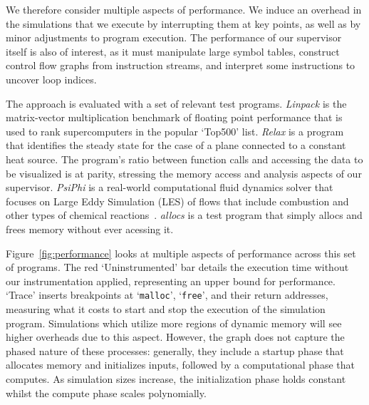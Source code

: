 %

We therefore consider multiple aspects of performance.  We induce an
overhead in the simulations that we execute by interrupting them at
key points, as well as by minor adjustments to program execution.  The
performance of our supervisor itself is also of interest, as it must
manipulate large symbol tables, construct control flow graphs from
instruction streams, and interpret some instructions to uncover loop
indices.

The approach is evaluated with a set of relevant test programs.
\textit{Linpack} is the matrix-vector multiplication benchmark of
floating point performance that is used to rank supercomputers in the
popular `Top500' list. \textit{Relax} is a program that identifies
the steady state for the case of a plane connected to a constant heat
source.  The program's ratio between function calls and accessing the
data to be visualized is at parity, stressing the memory access and
analysis aspects of our supervisor. \textit{PsiPhi} is a real-world
computational fluid dynamics solver that focuses on Large Eddy
Simulation (LES) of flows that include combustion and other types of
chemical reactions~\cite{Proch:2014:PsiPhi}. \textit{allocs} is a test
program that simply allocs and frees memory without ever acessing it.

Figure~\ref{fig:performance} looks at multiple aspects of performance
across this set of programs.  The red `Uninstrumented' bar details the
execution time without our instrumentation applied, representing an
upper bound for performance.  `Trace' inserts breakpoints at
`\texttt{malloc}', `\texttt{free}', and their return addresses,
measuring what it costs to start and stop the execution of the
simulation program.  Simulations which utilize more regions of dynamic
memory will see higher overheads due to this aspect.  However, the
graph does not capture the phased nature of these processes: generally,
they include a startup phase that allocates memory and initializes
inputs, followed by a computational phase that computes.  As simulation
sizes increase, the initialization phase holds constant whilst the
compute phase scales polynomially.

